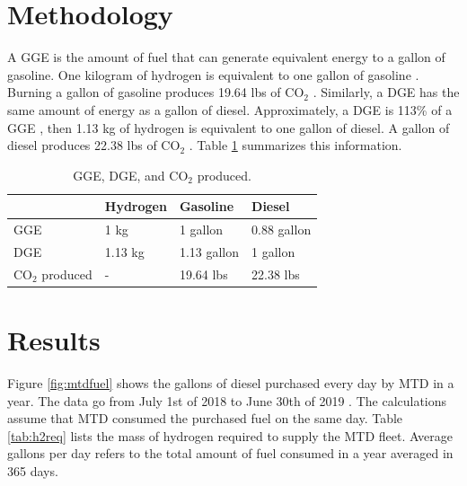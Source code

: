 \documentclass{anstrans}
\begin{document}
\section{Methodology}
\label{method}

A \gls{GGE} is the amount of fuel that can generate equivalent energy to a gallon of gasoline. One kilogram of hydrogen is equivalent to one gallon of gasoline \cite{doe_office_of_energy_efficiency_and_renewable_energy_hydrogen_2020}.
Burning a gallon of gasoline produces 19.64 lbs of CO$_2$ \cite{us_energy_information_administration_how_2014}. 
Similarly, a \gls{DGE} has the same amount of energy as a gallon of diesel. Approximately, a \gls{DGE} is 113\% of a \gls{GGE} \cite{alternative_fuels_data_center_fuel_2014}, then 1.13 kg of hydrogen is equivalent to one gallon of diesel.
A gallon of diesel produces 22.38 lbs of CO$_2$ \cite{us_energy_information_administration_how_2014}. 
Table \ref{tab:meth} summarizes this information.

\begin{table}[]
	\centering
    \caption{\gls{GGE}, \gls{DGE}, and CO$_2$ produced.}
    \label{tab:meth}
	\begin{tabular}{l|lll}
	\hline
	                 & Hydrogen & Gasoline    & Diesel      \\ \hline
	GGE              & 1 kg     & 1 gallon    & 0.88 gallon \\
	DGE              & 1.13 kg  & 1.13 gallon & 1 gallon    \\
    CO$_2$ produced  & -        & 19.64 lbs   & 22.38 lbs   \\ \hline

	\end{tabular}
\end{table}

\section{Results}

Figure \ref{fig:mtdfuel} shows the gallons of diesel purchased every day by \gls{MTD} in a year. The data go from July 1st of 2018 to June 30th of 2019 \cite{mtd_irecords_2019}. The calculations assume that MTD consumed the purchased fuel on the same day.
Table \ref{tab:h2req} lists the mass of hydrogen required to supply the \gls{MTD} fleet. Average gallons per day refers to the total amount of fuel consumed in a year averaged in 365 days. 
\end{document}

